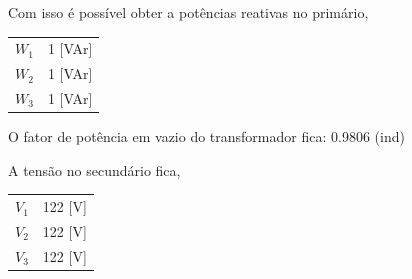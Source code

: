 \documentclass[paper=a4, fontsize=11pt]{article}
\begin{document}
Com isso é possível obter a potências reativas no primário,

\begin{center}
    \begin{tabular}{c||c}
        $W_1$ & 1 [VAr] \\
        $W_2$ & 1 [VAr] \\
        $W_3$ & 1 [VAr] \\
    \end{tabular}
\end{center}

O fator de potência em vazio do transformador fica: 0.9806 (ind)

A tensão no secundário fica,

\begin{center}
    \begin{tabular}{c||c}
        $V_1$ & 122 [V] \\
        $V_2$ & 122 [V] \\
        $V_3$ & 122 [V] \\
    \end{tabular}
\end{center}
\end{document}
